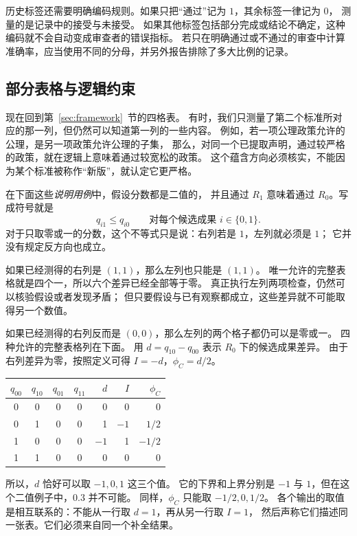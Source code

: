 历史标签还需要明确编码规则。如果只把“通过”记为 $1$，其余标签一律记为 $0$，
测量的是记录中的接受与未接受。
如果其他标签包括部分完成或结论不确定，这种编码就不会自动变成审查者的错误指标。
若只在明确通过或不通过的审查中计算准确率，应当使用不同的分母，并另外报告排除了多大比例的记录。



\subsection{部分表格与逻辑约束}
\label{sec:feasible-tables}

现在回到第~\ref{sec:framework}~节的四格表。
有时，我们只测量了第二个标准所对应的那一列，但仍然可以知道第一列的一些内容。
例如，若一项公理政策允许的公理，是另一项政策允许公理的子集，
那么，对同一个已提取声明，通过较严格的政策，就在逻辑上意味着通过较宽松的政策。
这个蕴含方向必须核实，不能因为某个标准被称作“新版”，就认定它更严格。

在下面这些\emph{说明用例}中，假设分数都是二值的，
并且通过 $R_1$ 意味着通过 $R_0$。写成符号就是
\[
q_{i1}\le q_{i0}\qquad\text{对每个候选成果 }i\in\{0,1\}.
\]
对于只取零或一的分数，这个不等式只是说：右列若是 $1$，左列就必须是 $1$；
它并没有规定反方向也成立。

如果已经测得的右列是 $(1,1)$，那么左列也只能是 $(1,1)$。
唯一允许的完整表格就是四个一，所以六个差异已经全部等于零。
真正执行左列两项检查，仍然可以核验假设或者发现矛盾；
但只要假设与已有观察都成立，这些差异就不可能取得另一个数值。

如果已经测得的右列反而是 $(0,0)$，那么左列的两个格子都仍可以是零或一。
四种允许的完整表格列在下面。
用 $d=q_{10}-q_{00}$ 表示 $R_0$ 下的候选成果差异。
由于右列差异为零，按照定义可得 $I=-d$，$\phi_C=d/2$。

\begin{center}
\begin{tabular}{ccccrrr}
\toprule
$q_{00}$ & $q_{10}$ & $q_{01}$ & $q_{11}$ & $d$ & $I$ & $\phi_C$\\
\midrule
0 & 0 & 0 & 0 & 0 & 0 & 0\\
0 & 1 & 0 & 0 & 1 & $-1$ & $1/2$\\
1 & 0 & 0 & 0 & $-1$ & 1 & $-1/2$\\
1 & 1 & 0 & 0 & 0 & 0 & 0\\
\bottomrule
\end{tabular}
\end{center}

所以，$d$ 恰好可以取 $-1,0,1$ 这三个值。
它的下界和上界分别是 $-1$ 与 $1$，但在这个二值例子中，$0.3$ 并不可能。
同样，$\phi_C$ 只能取 $-1/2,0,1/2$。
各个输出的取值是相互联系的：不能从一行取 $d=1$，再从另一行取 $I=1$，
然后声称它们描述同一张表。它们必须来自同一个补全结果。

